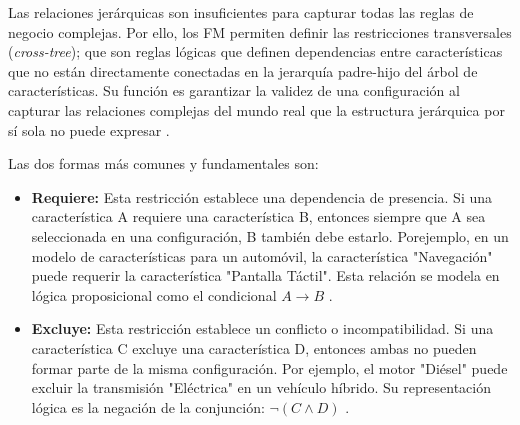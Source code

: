 {{{            

            Las relaciones jerárquicas son insuficientes para capturar todas las reglas de
            negocio complejas. Por ello, los \ac{FM} permiten definir las restricciones transversales 
            (\textit{cross-tree}); que son reglas lógicas que definen
            dependencias entre características que no están directamente conectadas en
            la jerarquía padre-hijo del árbol de características. Su función es garantizar la
            validez de una configuración al capturar las relaciones complejas del mundo
            real que la estructura jerárquica por sí sola no puede expresar 
            \citep{sundermann2023sat,benavides2005Taxonomy}.

            Las dos formas más comunes y fundamentales son:
            \begin{itemize}
                \item \textbf{Requiere:} Esta restricción establece una dependencia de presencia. Si
                una característica A requiere una característica B, entonces siempre que
                A sea seleccionada en una configuración, B también debe estarlo. Porejemplo, en un modelo de características para un automóvil, la
                característica "Navegación" puede requerir la característica "Pantalla
                Táctil". Esta relación se modela en lógica proposicional como el
                condicional $A \rightarrow B$ \citep{sundermann2023sat, benavides2005Taxonomy}.
                \item \textbf{Excluye:} Esta restricción establece un conflicto o incompatibilidad. Si
                una característica C excluye una característica D, entonces ambas no
                pueden formar parte de la misma configuración. Por ejemplo, el motor
                "Diésel" puede excluir la transmisión "Eléctrica" en un vehículo híbrido.
                Su representación lógica es la negación de la conjunción: $\neg(C \land D)$
                \citep{sundermann2023sat, benavides2005Taxonomy}.
            \end{itemize}


}}}
